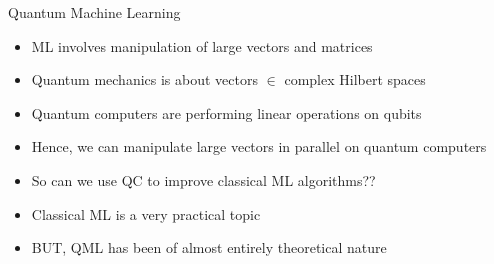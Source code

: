 \documentclass[10pt]{beamer}
\begin{document}
{
\begin{frame}[fragile]{Quantum Machine Learning}

\begin{itemize}
\item ML involves manipulation of large vectors and matrices
\item Quantum mechanics is about vectors $\in$ complex Hilbert spaces
\item Quantum computers are performing linear operations on qubits
\item Hence, we can manipulate large vectors in parallel on quantum computers
\item So can we use QC to improve classical ML algorithms??
\vspace{8mm}
\item Classical ML is a very practical topic\\
\item BUT, QML has been of almost entirely theoretical nature
\end{itemize}
\end{frame}
}
\end{document}
